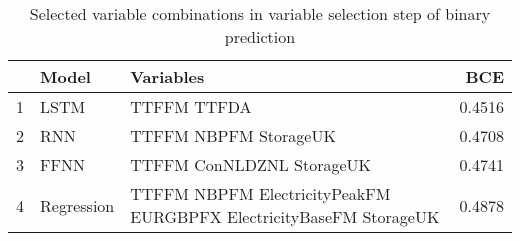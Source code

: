 \begin{table}[ht]
\centering
\begin{tabular}{rllr}
  \hline
 & Model & Variables & BCE \\ 
  \hline
1 & LSTM & TTFFM TTFDA & 0.4516 \\ 
  2 & RNN & TTFFM NBPFM StorageUK & 0.4708 \\ 
  3 & FFNN & TTFFM ConNLDZNL StorageUK & 0.4741 \\ 
  4 & Regression & TTFFM NBPFM ElectricityPeakFM EURGBPFX ElectricityBaseFM StorageUK & 0.4878 \\ 
   \hline
\end{tabular}
\caption{Selected variable combinations in variable selection step of binary prediction} 
\label{tab:binary.var.selection.short}
\end{table}

